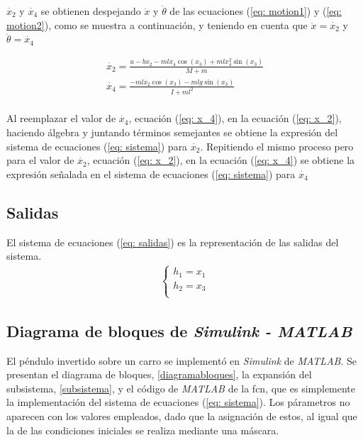 \documentclass{ieeeaccess}
\begin{document}
$\dot{x_2}$ y $\dot{x_4}$ se obtienen despejando $\ddot{x}$ y $\ddot{\theta}$ de las ecuaciones (\ref{eq: motion1}) y (\ref{eq: motion2}), como se muestra a continuación, y teniendo en cuenta que $\ddot{x}=\dot{x_2}$ y $\ddot{\theta}=\dot{x_4}$

\begin{eqnarray}
\label{eq: x_2}
\dot{x_2} = \displaystyle\frac{u-bx_2-ml\dot{x_4}\cos(x_3)+mlx_4^2\sin(x_3)}{M+m}\\
\label{eq: x_4}
\dot{x_4} = \displaystyle\frac{-ml\dot{x_2}\cos(x_3)-mlg\sin(x_3)}{I+ml^2}
\end{eqnarray}\\

Al reemplazar el valor de $\dot{x_4}$, ecuación (\ref{eq: x_4}), en la ecuación (\ref{eq: x_2}), haciendo álgebra y juntando términos semejantes se obtiene la expresión del sistema de ecuaciones (\ref{eq: sistema}) para $\dot{x_2}$. Repitiendo el mismo proceso pero para el valor de $\dot{x_2}$, ecuación (\ref{eq: x_2}), en la ecuación (\ref{eq: x_4}) se obtiene la expresión señalada en el sistema de ecuaciones (\ref{eq: sistema}) para $\dot{x_4}$

\subsection{Salidas}
El sistema de ecuaciones (\ref{eq: salidas}) es la representación de las salidas del sistema.
\begin{eqnarray}
\label{eq: salidas}
\left\{
\begin{array}{ll}
	h_1=x_1\\
    h_2=x_3\\
\end{array}
\right.
\end{eqnarray}

\subsection{Diagrama de bloques de \textit{Simulink - MATLAB}}

El péndulo invertido sobre un carro se implementó en \textit{Simulink} de \textit{MATLAB}. Se presentan el diagrama de bloques, \ref{diagramabloques}, la expansión del subsistema, \ref{subsistema}, y el código de \textit{MATLAB} de la fcn, que es simplemente la implementación del sistema de ecuaciones (\ref{eq: sistema}). Los párametros no aparecen con los valores empleados, dado que la asignación de estos, al igual que la de las condiciones iniciales se realiza mediante una máscara.
\end{document}

